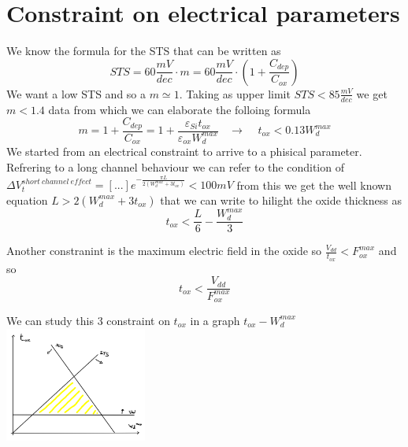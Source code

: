 \section{Constraint on electrical parameters}

We know the formula for the STS that can be written as
\begin{equation}
STS=60 \frac{mV}{dec} \cdot m =60 \frac{mV}{dec} \cdot (1+\frac{C_{dep}}{C_{ox}})
\end{equation}
We want a low STS and so a $m\simeq 1$. Taking as upper limit $STS<85 \frac{mV}{dec}$ we get $m<1.4$ data from which we can elaborate the folloing formula 
\begin{equation}
m=1+\frac{C_{dep}}{C_{ox}}=1+\frac{\varepsilon_{Si}t_{ox}}{\varepsilon_{ox}W_d^{max}}\ \ \ \ \rightarrow \ \ \ \ \ t_{ox}<0.13W_d^{max}
\end{equation} 
We started from an electrical constraint to arrive to a phisical parameter.\\
\vspace{5mm}
Refrering to a long channel behaviour we can refer to the condition of $\Delta V_t^{short \ channel \ effect}=[...]e^{-\frac{\pi L}{2(W_{d}^{max}+3t_{ox})}}<100mV$ from this we get the well known equation $L>2(W_d^{max}+3t_{ox})$ that we can write to hilight the oxide thickness as 
\begin{equation}
t_{ox}<\frac{L}{6}-\frac{W_{d}^{max}}{3}
\end{equation}
\vspace{5mm}

Another constranint is the maximum electric field in the oxide so $\frac{V_{dd}}{t_{ox}}<F_{ox}^{max}$ and so 
\begin{equation}
t_{ox}<\frac{V_{dd}}{F_{ox}^{max}}
\end{equation}
\vspace{5mm}

We can study this 3 constraint on $t_{ox}$ in a graph $t_{ox}-W_d^{max}$\\

\centering
\includegraphics[width=0.35\textwidth]{trianglemos.png}\\
\raggedright

